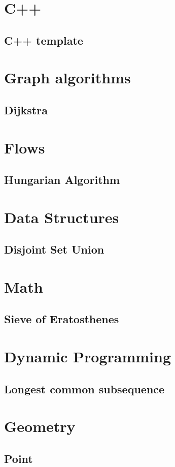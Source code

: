 \section{C++}
\subsection{C++ template}
\raggedbottom
\hrulefill

\section{Graph algorithms}
\subsection{Dijkstra}
\raggedbottom
\hrulefill

\section{Flows}
\subsection{Hungarian Algorithm}
\raggedbottom
\hrulefill

\section{Data Structures}
\subsection{Disjoint Set Union}
\raggedbottom
\hrulefill

\section{Math}
\subsection{Sieve of Eratosthenes}
\raggedbottom
\hrulefill

\section{Dynamic Programming}
\subsection{Longest common subsequence}
\raggedbottom
\hrulefill

\section{Geometry}
\subsection{Point}
\raggedbottom
\hrulefill

